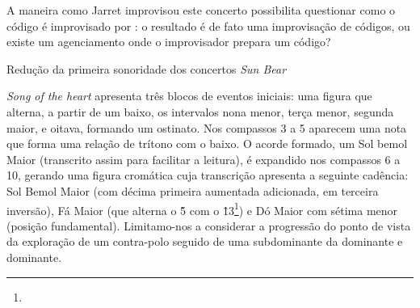 A maneira como Jarret improvisou este concerto possibilita questionar como o código é improvisado por : o resultado é de fato uma improvisação de códigos, ou existe um agenciamento onde o improvisador prepara um código?

\begin{example}{Redução da primeira sonoridade dos concertos \emph{Sun Bear}}\label{ex:schenker}


\emph{Song of the heart} apresenta três blocos de eventos iniciais: uma figura que alterna, a partir de um baixo, os intervalos nona menor, terça menor, segunda maior, e oitava, formando um ostinato. Nos compassos 3 a 5 aparecem uma nota que forma uma relação de trítono com o baixo. O acorde formado, um Sol bemol Maior (transcrito assim para facilitar a leitura), é expandido nos compassos 6 a 10, gerando uma figura cromática cuja transcrição apresenta a seguinte cadência: Sol Bemol Maior (com décima primeira aumentada adicionada, em terceira inversão), Fá Maior (que alterna o \^5 com o \^13\footnote{}) e Dó Maior com sétima menor (posição fundamental). Limitamo-nos a considerar a progressão do ponto de vista da exploração de um contra-polo seguido de uma subdominante da dominante e dominante.  


\end{example}

